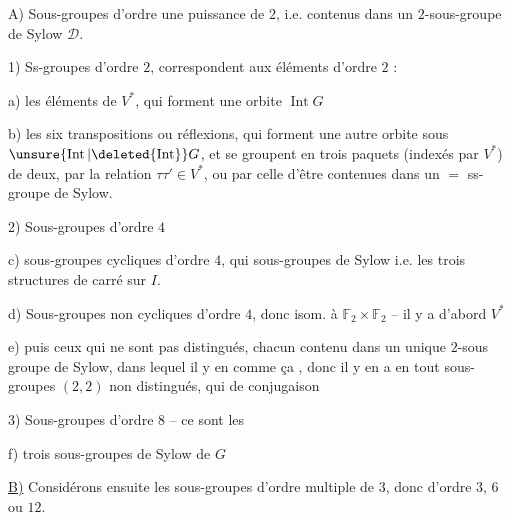 A) Sous-groupes d'ordre une puissance de $2$, i.e. contenus dans un $2$-sous-groupe de Sylow $\mathcal D$.


1) Ss-groupes d'ordre $2$, correspondent aux éléments d'ordre $2$ :

a) les  éléments de $V^*$, qui forment une orbite  $\operatorname{Int}G$

b) les six transpositions ou réflexions, qui forment une autre orbite sous $\unsure{\operatorname{Int}|\deleted{\operatorname{Int}}}G$, et se groupent en trois paquets (indexés par $V^*$) de deux, par la relation $\tau\tau'\in V^*$, ou par celle d'être contenues dans un $=$ ss-groupe de Sylow.


2) Sous-groupes  d'ordre $4$

c)  sous-groupes cycliques d'ordre $4$, qui   sous-groupes de Sylow i.e. les trois structures de carré sur $I$.

d) Sous-groupes non cycliques d'ordre $4$, donc isom. à $\mathbb F_2\times\mathbb F_2$ -- il y a d'abord $V^*$

e) puis ceux qui ne sont pas distingués, chacun contenu dans un unique $2$-sous groupe de Sylow, dans lequel il y en   comme ça , donc il y en a en tout   sous-groupes  $(2,2)$ non distingués, qui    de conjugaison 

3) Sous-groupes d'ordre $8$ -- ce sont les

f) trois sous-groupes de Sylow de $G$



\uline{B)} Considérons ensuite les sous-groupes  d'ordre multiple de $3$, donc d'ordre $3$, $6$ ou $12$.

